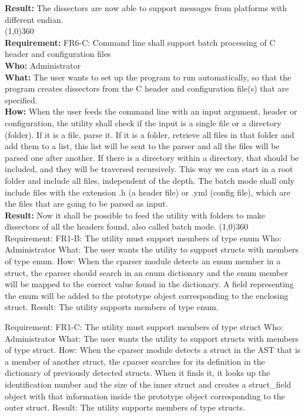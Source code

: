 \textbf{Result:} The dissectors are now able to support messages from platforms with different endian.\\
\line(1,0){360}\\
\textbf{Requirement:} FR6-C: Command line shall support batch processing of C header and configuration files\\
\textbf{Who:} Administrator\\
\textbf{What:} The user wants to set up the program to run automatically, so that the program creates dissectors from the C header and configuration file(s) that are specified.\\
\textbf{How:} When the user feeds the command line with an input argument, header or configuration, the utility shall check if the input is a single file or a directory (folder). If it is a file, parse it. If it is a folder, retrieve all files in that folder and add them to a list, this list will be sent to the parser and all the files will be parsed one after another. If there is a directory within a directory, that should be included, and they will be traversed recursively. This way we can start in a root folder and include all files, independent of the depth. The batch mode shall only include files with the extension .h (a header file) or .yml (config file), which are the files that are going to be parsed as input.\\
\textbf{Result:} Now it shall be possible to feed the utility with folders to make dissectors of all the headers found, also called batch mode.
\line(1,0){360}\\	

Requirement: FR1-B: The utility must support members of type enum
Who: Administrator
What: The user wants the utility to support structs with members of type enum.
How: When the cparser module detects an enum member in a struct, the cparser should search in an enum dictionary and the enum member will be mapped to the correct value found in the dictionary. A field representing the enum will be added to the prototype object corresponding to the enclosing struct.
Result: The utility supports members of type enum.

Requirement: FR1-C: The utility must support members of type struct
Who: Administrator
What: The user wants the utility to support structs with members of type struct. 
How: When the cparser module detects a struct in the AST that is a member of another struct, the cparser searches for its definition in the dictionary of previously detected structs. When it finds it, it looks up the identification number and the size of the inner struct and creates a struct\_field object with that information inside the prototype object corresponding to the outer struct.
Result: The utility supports members of type structs.


